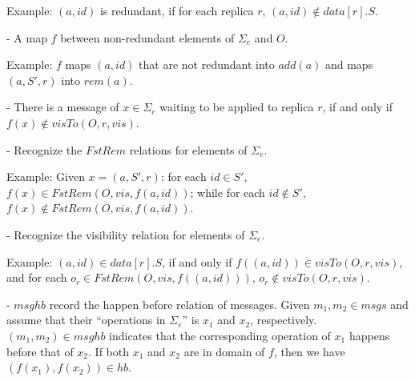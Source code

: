 Example: $(a,\mathit{id})$ is redundant, if for each replica $r$, $(a,\mathit{id}) \notin \mathit{data}[r].S$. 

\noindent - A map $f$ between non-redundant elements of $\Sigma_e$ and $O$.%

Example: $f$ maps $(a,\mathit{id})$ that are not redundant into $\mathit{add}(a)$ and maps $(a,S',r)$ into $\mathit{rem}(a)$. 


\noindent - There is a message of $x \in \Sigma_e$ waiting to be applied to replica $r$, if and only if $f(x) \notin \mathit{visTo}(O,r,\mathit{vis})$.

\noindent - Recognize the $\mathit{FstRem}$ relations for elements of $\Sigma_e$. 

Example: Given $x=(a,S',r)$: for each $\mathit{id} \in S'$, $f(x) \in \mathit{FstRem}(O,\mathit{vis},f(a,\mathit{id}))$; while for each $\mathit{id} \notin S'$, $f(x) \notin \mathit{FstRem}(O,\mathit{vis},f(a,\mathit{id}))$.

\noindent - Recognize the visibility relation for elements of $\Sigma_e$.

Example: $(a,\mathit{id}) \in data[r].S$, if and only if $f((a,\mathit{id})) \in \mathit{visTo}(O,r,\mathit{vis})$, and for each $o_r \in \mathit{FstRem}(O,\mathit{vis},f((a,\mathit{id})))$, $o_r \notin \mathit{visTo}(O,r,\mathit{vis})$. 

\noindent - {\color {red}$\mathit{msghb}$ record the happen before relation of messages. Given $m_1,m_2 \in \mathit{msgs}$ and assume that their ``operations in $\Sigma_e$'' is $x_1$ and $x_2$, respectively. $(m_1,m_2) \in \mathit{msghb}$ indicates that the corresponding operation of $x_1$ happens before that of $x_2$. If both $x_1$ and $x_2$ are in domain of $f$, then we have $(f(x_1),f(x_2)) \in \mathit{hb}$.}




